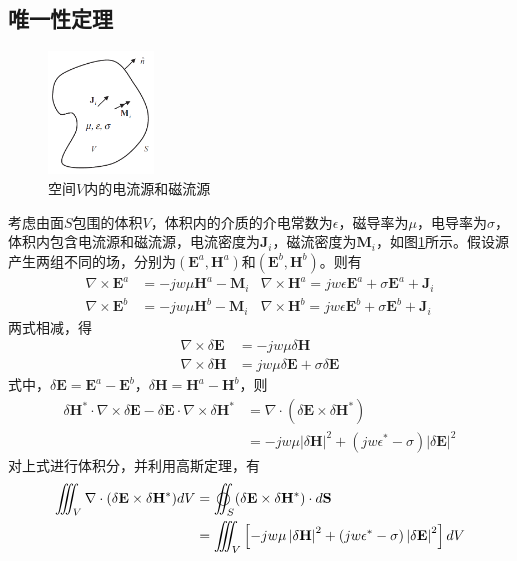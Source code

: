 \documentclass{article}
\numberwithin{equation}{section}
\begin{document}
\subsection{唯一性定理}
\begin{figure}[ht]
    \centering
    \includegraphics[width=0.25\textwidth]{唯一性定理.PNG}
    \caption{空间$V$内的电流源和磁流源}
    \label{fig:fig6}
\end{figure}
考虑由面$S$包围的体积$V$，体积内的介质的介电常数为$\epsilon$，磁导率为$\mu$，电导率为$\sigma$，体积内包含电流源和磁流源，电流密度为$\mathbf{J}_i$，磁流密度为$\mathbf{M}_i$，如图\ref{fig:fig6}所示。假设源产生两组不同的场，分别为$(\mathbf{E}^a,\mathbf{H}^a)$和$(\mathbf{E}^b,\mathbf{H}^b)$。则有
\begin{align}
    \label{eq:eq160}
    \nabla \times \mathbf{E}^a&=-jw\mu\mathbf{H}^a-\mathbf{M}_i &\nabla \times \mathbf{H}^a=jw\epsilon\mathbf{E}^a+\sigma\mathbf{E}^a+\mathbf{J}_i \\
    \label{eq:eq162}
    \nabla \times \mathbf{E}^b&=-jw\mu\mathbf{H}^b-\mathbf{M}_i &\nabla \times \mathbf{H}^b=jw\epsilon\mathbf{E}^b+\sigma\mathbf{E}^b+\mathbf{J}_i
\end{align}
两式相减，得
\begin{align}
    \label{eq:eq161}
    \nabla \times \delta \mathbf{E}&=-jw\mu\delta\mathbf{H} \\
    \label{eq:eq163}
    \nabla \times \delta \mathbf{H}&=jw\mu\delta\mathbf{E}+\sigma\delta\mathbf{E}
\end{align}
式中，$\delta \mathbf{E}=\mathbf{E}^a-\mathbf{E}^b$，$\delta \mathbf{H}=\mathbf{H}^a-\mathbf{H}^b$，则
\begin{align}
    \label{eq:eq164}
    \delta\mathbf{H}^*\cdot\nabla\times\delta\mathbf{E}-\delta\mathbf{E}\cdot\nabla\times\delta\mathbf{H}^*&=\nabla\cdot(\delta\mathbf{E}\times\delta\mathbf{H}^*) \nonumber \\
            &=-jw\mu\left|\delta\mathbf{H}\right|^2+(jw\epsilon^*-\sigma)\left|\delta\mathbf{E}\right|^2
\end{align}
对上式进行体积分，并利用高斯定理，有
\begin{align}
    \label{eq:eq165}
    \iiint_V \nabla\cdot(\delta\mathbf{E}\times\delta\mathbf{H}^*)dV&=\varoiint_S (\delta\mathbf{E}\times\delta\mathbf{H}^*)\cdot d\mathbf{S} \nonumber \\
        &=\iiint_V \left[-jw\mu\left|\delta\mathbf{H}\right|^2+(jw\epsilon^*-\sigma)\left|\delta\mathbf{E}\right|^2\right]dV
\end{align}
\end{document}
